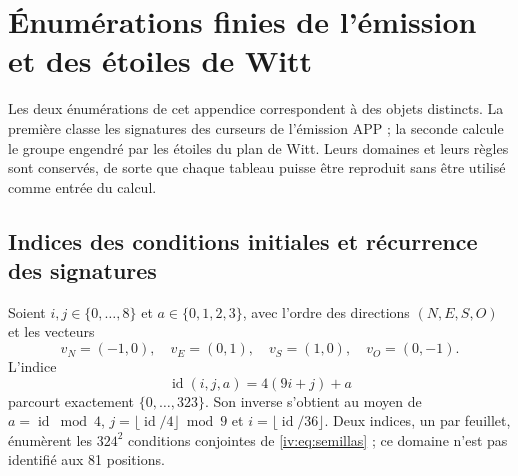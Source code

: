 \section{Énumérations finies de l’émission et des étoiles de Witt}
\label{iv:iv:apendice-enumeraciones}

Les deux énumérations de cet appendice correspondent à des objets distincts.
La première classe les signatures des curseurs de l’émission APP ;
la seconde calcule le groupe engendré par les étoiles du plan de Witt.
Leurs domaines et leurs règles sont conservés, de sorte que chaque tableau puisse
être reproduit sans être utilisé comme entrée du calcul.

\subsection{Indices des conditions initiales et récurrence des signatures}
\label{iv:iv:apendice-firmas}

Soient \(i,j\in\{0,\ldots,8\}\) et \(a\in\{0,1,2,3\}\), avec l’ordre
des directions \((N,E,S,O)\) et les vecteurs
\[
 v_N=(-1,0),\quad v_E=(0,1),\quad
 v_S=(1,0),\quad v_O=(0,-1).
\]
L’indice
\[
 \operatorname{id}(i,j,a)=4(9i+j)+a
\]
parcourt exactement \(\{0,\ldots,323\}\). Son inverse s’obtient
au moyen de \(a=\operatorname{id}\bmod4\),
\(j=\lfloor\operatorname{id}/4\rfloor\bmod9\) et
\(i=\lfloor\operatorname{id}/36\rfloor\).
Deux indices, un par feuillet, énumèrent les \(324^2\) conditions conjointes
de \eqref{iv:eq:semillas} ; ce domaine n’est pas identifié aux 81 positions.

